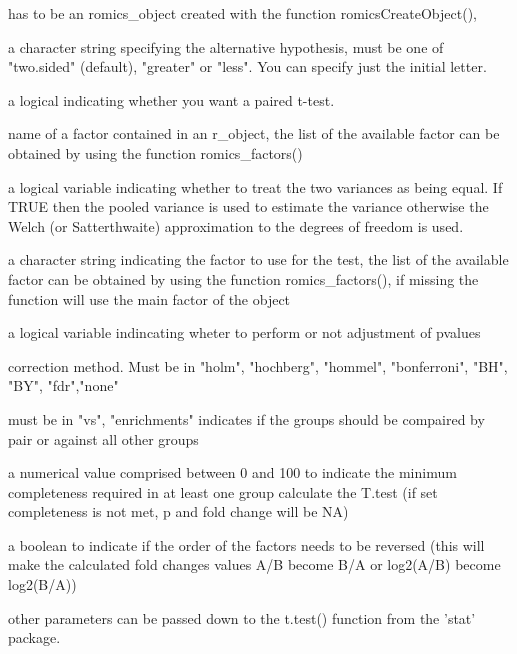 \documentclass[a4paper]{book}
\begin{document}
\begin{Arguments}
\begin{ldescription}
\item[\code{romics\_object}] has to be an romics\_object created with the function romicsCreateObject(),

\item[\code{alternative}] a character string specifying the alternative hypothesis, must be one of "two.sided" (default), "greater" or "less". You can specify just the initial letter.

\item[\code{paired}] a logical indicating whether you want a paired t-test.

\item[\code{pairing\_factor}] name of a factor contained in an r\_object, the list of the available factor can be obtained by using the function romics\_factors()

\item[\code{var.equal}] a logical variable indicating whether to treat the two variances as being equal. If TRUE then the pooled variance is used to estimate the variance otherwise the Welch (or Satterthwaite) approximation to the degrees of freedom is used.

\item[\code{factor}] a character string indicating the factor to use for the test, the list of the available factor can be obtained by using the function romics\_factors(), if missing the function will use the main factor of the object

\item[\code{padj}] a logical variable indincating wheter to perform or not adjustment of pvalues

\item[\code{padj\_method}] correction method. Must be in  "holm", "hochberg", "hommel", "bonferroni", "BH", "BY", "fdr","none"

\item[\code{mode}] must be in "vs", "enrichments" indicates if the groups should be compaired by pair or against all other groups

\item[\code{percentage\_completeness}] a numerical value comprised between 0 and 100 to indicate the minimum completeness required in at least one group calculate the T.test (if set completeness is not met, p and fold change will be NA)

\item[\code{reverse\_order}] a boolean to indicate if the order of the factors needs to be reversed (this will make the calculated fold changes values A/B become B/A or log2(A/B) become log2(B/A))

\item[\code{...}] other parameters can be passed down to the t.test() function from the 'stat' package.
\end{ldescription}
\end{Arguments}
\end{document}
